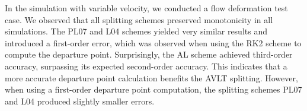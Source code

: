 In the simulation with variable velocity, we conducted a flow deformation test case.
We observed that all splitting schemes preserved monotonicity in all simulations.
The PL07 and L04 schemes yielded very similar results and introduced a first-order error,
which was observed when using the RK2 scheme to compute the departure point.
Surprisingly, the AL scheme achieved third-order accuracy, surpassing its expected second-order accuracy.
This indicates that a more accurate departure point calculation benefits the AVLT splitting.
However, when using a first-order departure point computation, the splitting schemes PL07 and L04 produced slightly smaller errors.

